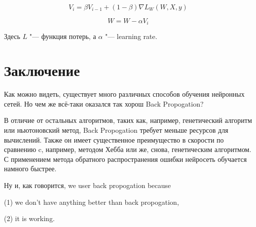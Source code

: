 \documentclass[a4paper,10pt]{article}
\theoremstyle{plain} %
\theoremstyle{definition} %
\theoremstyle{remark} %
\begin{document}
\begin{equation*}
    V_i = \beta V_{i - 1} + (1 - \beta) \nabla L_W(W, X, y)
\end{equation*}

\begin{equation*}
    W = W - \alpha V_i
\end{equation*}

Здесь $L$ "--- функция потерь, а $\alpha$ "--- learning rate.

\section{Заключение}

Как можно видеть, существует много различных способов обучения нейронных сетей. Но чем же всё-таки оказался так хорош Back Propogation?

В отличие от остальных алгоритмов, таких как, например, генетический алгоритм или ньютоновский метод, Back Propogation требует меньше ресурсов для вычислений. Также он имеет существенное преимущество в скорости по сравнению c, например, методом Хебба или же, снова, генетическим алгоритмом. С применением метода обратного распространения ошибки нейросеть обучается намного быстрее.

Ну и, как говорится, we user back propogation because

(1) we don't have anything better than back propogation,

(2) it is working.
\end{document}
